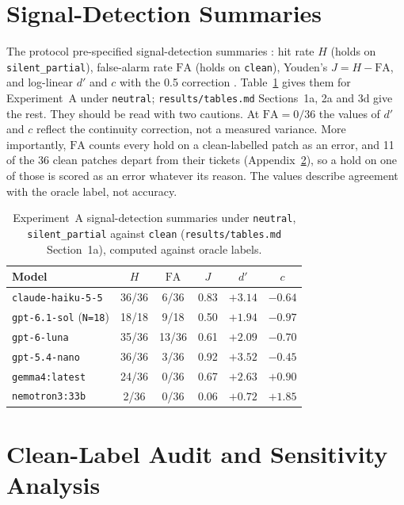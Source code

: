 \documentclass[11pt]{article}
\begin{document}
\section{Signal-Detection Summaries}
\label{app:sdt}

The protocol pre-specified signal-detection summaries \citep{stanislaw1999sdt}: hit rate \(H\) (holds on \texttt{silent\_partial}), false-alarm rate \(\mathrm{FA}\) (holds on \texttt{clean}), Youden's \(J = H - \mathrm{FA}\), and log-linear \(d'\) and \(c\) with the 0.5 correction \citep{hautus1995corrections}. Table~\ref{tab:sdt} gives them for Experiment~A under \texttt{neutral}; \texttt{results/tables.md} Sections~1a, 2a and 3d give the rest. They should be read with two cautions. At \(\mathrm{FA} = 0/36\) the values of \(d'\) and \(c\) reflect the continuity correction, not a measured variance. More importantly, \(\mathrm{FA}\) counts every hold on a clean-labelled patch as an error, and 11 of the 36 clean patches depart from their tickets (Appendix~\ref{app:audit}), so a hold on one of those is scored as an error whatever its reason. The values describe agreement with the oracle label, not accuracy.

\begin{table}[h]
\centering
\small
\begin{tabular}{l c c c c c}
\toprule
\textbf{Model} & \(H\) & \(\mathrm{FA}\) & \(J\) & \(d'\) & \(c\) \\
\midrule
\texttt{claude-haiku-5-5} & 36/36 & 6/36 & 0.83 & \(+3.14\) & \(-0.64\) \\
\texttt{gpt-6.1-sol} (\texttt{N=18}) & 18/18 & 9/18 & 0.50 & \(+1.94\) & \(-0.97\) \\
\texttt{gpt-6-luna} & 35/36 & 13/36 & 0.61 & \(+2.09\) & \(-0.70\) \\
\texttt{gpt-5.4-nano} & 36/36 & 3/36 & 0.92 & \(+3.52\) & \(-0.45\) \\
\texttt{gemma4:latest} & 24/36 & 0/36 & 0.67 & \(+2.63\) & \(+0.90\) \\
\texttt{nemotron3:33b} & 2/36 & 0/36 & 0.06 & \(+0.72\) & \(+1.85\) \\
\bottomrule
\end{tabular}
\caption{Experiment~A signal-detection summaries under \texttt{neutral}, \texttt{silent\_partial} against \texttt{clean} (\texttt{results/tables.md} Section~1a), computed against oracle labels.}
\label{tab:sdt}
\end{table}

\section{Clean-Label Audit and Sensitivity Analysis}
\label{app:audit}
\end{document}
